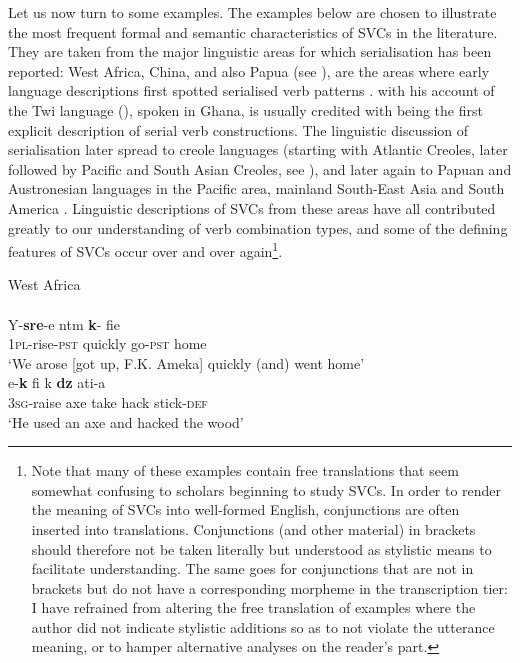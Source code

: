 Let us now turn to some examples. The examples below are chosen to illustrate the most frequent formal and semantic characteristics of SVCs in the literature. They are taken from the major linguistic areas for which serialisation has been reported: West Africa, China, and also Papua (see \citealt[2]{senft2008intro}), are the areas where early language descriptions first spotted serialised verb patterns \citep{sebba1987syntax, Matthews2006}. \citet{christaller1875} with his account of the Twi language (), spoken in Ghana, is usually credited with being the first explicit description of serial verb constructions. The linguistic discussion of serialisation later spread to creole languages (starting with Atlantic Creoles, later followed by Pacific and South Asian Creoles, see \citealt{nordhoff2012}), and later again to Papuan and Austronesian languages in the Pacific area, mainland South-East Asia and South America \citep{senft2008event}. Linguistic descriptions of SVCs from these areas have all contributed greatly to our understanding of verb combination types, and some of the defining features of SVCs occur over and over again\footnote{Note that many of these examples contain free translations that seem somewhat confusing to scholars beginning to study SVCs. In order to render the meaning of SVCs into well-formed English, conjunctions are often inserted into translations. Conjunctions (and other material) in brackets should therefore not be taken literally but understood as stylistic means to facilitate understanding. The same goes for conjunctions that are not in brackets but do not have a corresponding morpheme in the transcription tier: I have refrained from altering the free translation of examples where the author did not indicate stylistic additions so as to not violate the utterance meaning, or to hamper alternative analyses on the reader's part.}.

\ea
West Africa\\
\ea \label{Twi01}
\\
\gll Y-\textbf{sre}-e ntm \textbf{k}-  fie\\
\textsc{1}\textsc{pl}-rise-\textsc{pst} quickly go-\textsc{pst} home\\
\glt ‘We arose [got up, F.K. Ameka] quickly (and) went home’
\ex \label{Ewe01}
\\
\gll e-\textbf{k} fi k \textbf{dz} ati-a \\
\textsc{3}\textsc{sg}-raise axe take hack stick-\textsc{def}\\
\glt ‘He used an axe and hacked the wood’
\z
\z

